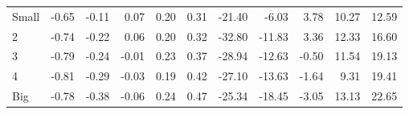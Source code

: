\begin{table}[!ht]
\begin{tabular}{lrrrrrrrrrr}
    \\
      \cmidrule(r){2-6} \cmidrule(r){7-11}

    Small   & -0.65  & -0.11  & 0.07  & 0.20  & 0.31  & -21.40  & -6.03  & 3.78  & 10.27  & 12.59  \\
         2  & -0.74  & -0.22  & 0.06  & 0.20  & 0.32  & -32.80  & -11.83  & 3.36  & 12.33  & 16.60  \\
         3  & -0.79  & -0.24  & -0.01  & 0.23  & 0.37  & -28.94  & -12.63  & -0.50  & 11.54  & 19.13  \\
         4  & -0.81  & -0.29  & -0.03  & 0.19  & 0.42  & -27.10  & -13.63  & -1.64  & 9.31  & 19.41  \\
    Big     & -0.78  & -0.38  & -0.06  & 0.24  & 0.47  & -25.34  & -18.45  & -3.05  & 13.13  & 22.65  \\

  

  \bottomrule
\end{tabular}
\label{tbl:25_Size_Prior_C1997b}
\end{table}